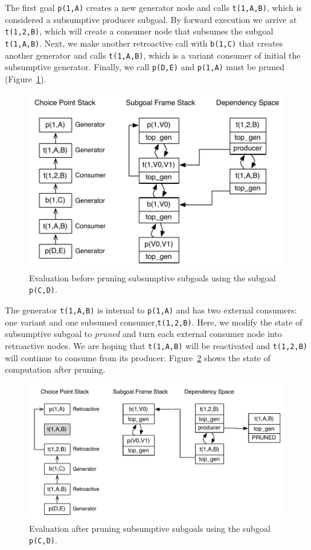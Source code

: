 The first goal \texttt{p(1,A)}
creates a new generator node and calls \texttt{t(1,A,B)}, which is considered a subsumptive producer subgoal.
By forward execution we arrive at \texttt{t(1,2,B)}, which will create a consumer node that subsumes
the subgoal \texttt{t(1,A,B)}. Next, we make another retroactive call with \texttt{b(1,C)} that creates
another generator and calls \texttt{t(1,A,B)}, which is a variant consumer of initial the subsumptive generator.
Finally, we call \texttt{p(D,E)} and \texttt{p(1,A)} must be pruned (Figure~\ref{fig:retro_sub1}).

\begin{figure}[ht]
  \centering
    \includegraphics[scale=0.5]{retro_sub1.pdf}
  \caption{Evaluation before pruning subsumptive subgoals using the subgoal \texttt{p(C,D)}.}
  \label{fig:retro_sub1}
\end{figure}

The generator \texttt{t(1,A,B)} is internal to \texttt{p(1,A)} and has two external consumers: one variant
and one subsumed consumer,\texttt{t(1,2,B)}. Here, we modify the state of subsumptive subgoal to \textit{pruned}
and turn each external consumer node into retroactive nodes. We are hoping that \texttt{t(1,A,B)} will be
reactivated and \texttt{t(1,2,B)} will continue to consume from its producer. Figure~\ref{fig:retro_sub2}
shows the state of computation after pruning.

\begin{figure}[ht]
  \centering
    \includegraphics[scale=0.5]{retro_sub2.pdf}
  \caption{Evaluation after pruning subsumptive subgoals using the subgoal \texttt{p(C,D)}.}
  \label{fig:retro_sub2}
\end{figure}


